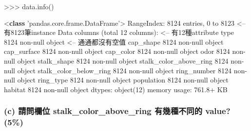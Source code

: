 \documentclass[11pt]{article}
\newenvironment{Shaded}{}{}
\newcommand{\KeywordTok}[1]{\textcolor[rgb]{0.00,0.44,0.13}{\textbf{{#1}}}}
\newcommand{\DecValTok}[1]{\textcolor[rgb]{0.25,0.63,0.44}{{#1}}}
\newcommand{\FloatTok}[1]{\textcolor[rgb]{0.25,0.63,0.44}{{#1}}}
\newcommand{\StringTok}[1]{\textcolor[rgb]{0.25,0.44,0.63}{{#1}}}
\newcommand{\NormalTok}[1]{{#1}}
\newcommand{\OperatorTok}[1]{\textcolor[rgb]{0.40,0.40,0.40}{{#1}}}
\newcommand{\BuiltInTok}[1]{{#1}}
\begin{document}
\begin{Shaded}
\begin{Highlighting}[]
\OperatorTok{>>>}\NormalTok{ data.info()}

\OperatorTok{<}\KeywordTok{class} \StringTok{'pandas.core.frame.DataFrame'}\OperatorTok{>}
\NormalTok{RangeIndex: }\DecValTok{8124}\NormalTok{ entries, }\DecValTok{0}\NormalTok{ to }\DecValTok{8123}              \OperatorTok{<--}\NormalTok{ 有8123筆instance}
\NormalTok{Data columns (total }\DecValTok{12}\NormalTok{ columns):                 }\OperatorTok{<--}\NormalTok{ 有12種attribute}
\BuiltInTok{type}                      \DecValTok{8124}\NormalTok{ non}\OperatorTok{-}\NormalTok{null }\BuiltInTok{object}   \OperatorTok{<--}\NormalTok{ 通通都沒有空值}
\NormalTok{cap_shape                 }\DecValTok{8124}\NormalTok{ non}\OperatorTok{-}\NormalTok{null }\BuiltInTok{object}
\NormalTok{cap_surface               }\DecValTok{8124}\NormalTok{ non}\OperatorTok{-}\NormalTok{null }\BuiltInTok{object}
\NormalTok{cap_color                 }\DecValTok{8124}\NormalTok{ non}\OperatorTok{-}\NormalTok{null }\BuiltInTok{object}
\NormalTok{odor                      }\DecValTok{8124}\NormalTok{ non}\OperatorTok{-}\NormalTok{null }\BuiltInTok{object}
\NormalTok{stalk_shape               }\DecValTok{8124}\NormalTok{ non}\OperatorTok{-}\NormalTok{null }\BuiltInTok{object}
\NormalTok{stalk_color_above_ring    }\DecValTok{8124}\NormalTok{ non}\OperatorTok{-}\NormalTok{null }\BuiltInTok{object}
\NormalTok{stalk_color_below_ring    }\DecValTok{8124}\NormalTok{ non}\OperatorTok{-}\NormalTok{null }\BuiltInTok{object}
\NormalTok{ring_number               }\DecValTok{8124}\NormalTok{ non}\OperatorTok{-}\NormalTok{null }\BuiltInTok{object}
\NormalTok{ring_type                 }\DecValTok{8124}\NormalTok{ non}\OperatorTok{-}\NormalTok{null }\BuiltInTok{object}
\NormalTok{population                }\DecValTok{8124}\NormalTok{ non}\OperatorTok{-}\NormalTok{null }\BuiltInTok{object}
\NormalTok{habitat                   }\DecValTok{8124}\NormalTok{ non}\OperatorTok{-}\NormalTok{null }\BuiltInTok{object}
\NormalTok{dtypes: }\BuiltInTok{object}\NormalTok{(}\DecValTok{12}\NormalTok{)}
\NormalTok{memory usage: }\FloatTok{761.8}\OperatorTok{+}\NormalTok{ KB}
\end{Highlighting}
\end{Shaded}

    \subsubsection{(c) 請問欄位 stalk\_color\_above\_ring 有幾種不同的
value?
(5\%)}\label{c-ux8acbux554fux6b04ux4f4d-stalk_color_above_ring-ux6709ux5e7eux7a2eux4e0dux540cux7684-value-5}
\end{document}
